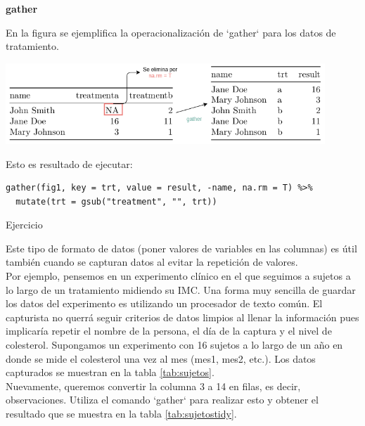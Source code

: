 \documentclass[]{article}
\begin{document}
\begin{nota} 
\textbf{gather\\}

En la figura se ejemplifica la operacionalización de `gather` para los datos de tratamiento.

\includegraphics[width=0.9\textwidth]{../img/gather.png}

Esto es resultado de ejecutar: \\

\begin{verbatim}
gather(fig1, key = trt, value = result, -name, na.rm = T) %>% 
  mutate(trt = gsub("treatment", "", trt))
\end{verbatim}

\end{nota}

\renewcommand\bcStyleTitre[1]{\large\textcolor{bbblack}{#1}}

\begin{bclogo}[
  couleur=llred,
  arrondi=0,
  logo=\bcstop,
  barre=none,
  noborder=true]{Ejercicio}

Este tipo de formato de datos (poner valores de variables en las columnas) 
es útil también cuando se capturan datos al evitar la repetición de valores. \\

Por ejemplo, pensemos en un experimento clínico en el que seguimos a sujetos
a lo largo de un tratamiento midiendo su IMC. Una forma muy
sencilla de guardar los datos del experimento es utilizando un procesador
de texto común. El capturista no querrá seguir criterios de datos limpios
al llenar la información pues implicaría repetir el nombre de la persona,
el día de la captura y el nivel de colesterol. Supongamos un experimento con
16 sujetos a lo largo de un año en donde se mide el colesterol una vez al mes (mes1, mes2, etc.). Los datos capturados se muestran en la tabla \ref{tab:sujetos}. \\

Nuevamente, queremos convertir la columna 3 a 14 en filas, es decir, observaciones.
Utiliza el comando `gather` para realizar esto y obtener el resultado que se
muestra en la tabla \ref{tab:sujetostidy}.
\end{bclogo}
\end{document}
